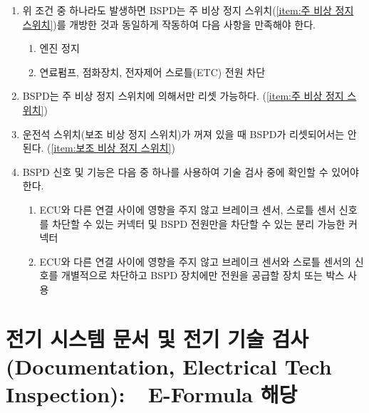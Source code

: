 \documentclass[final,a4paper,10pt]{report}
\begin{document}
\begin{enumerate}
\begin{enumerate}
      \item 위 조건 중 하나라도 발생하면 BSPD는 주 비상 정지 스위치(\cref{item:주 비상 정지 스위치})를 개방한 것과 동일하게 작동하여 다음 사항을 만족해야 한다.
        \begin{enumerate}
          \item 엔진 정지
          \item 연료펌프, 점화장치, 전자제어 스로틀(ETC) 전원 차단
        \end{enumerate}
        
      \item BSPD는 주 비상 정지 스위치에 의해서만 리셋 가능하다. (\cref{item:주 비상 정지 스위치})
      \item 운전석 스위치(보조 비상 정지 스위치)가 꺼져 있을 때 BSPD가 리셋되어서는 안 된다. (\cref{item:보조 비상 정지 스위치})
      
      \item BSPD 신호 및 기능은 다음 중 하나를 사용하여 기술 검사 중에 확인할 수 있어야 한다.
        \begin{enumerate}
          \item ECU와 다른 연결 사이에 영향을 주지 않고 브레이크 센서, 스로틀 센서 신호를 차단할 수 있는 커넥터 및 BSPD 전원만을 차단할 수 있는 분리 가능한 커넥터
          \item ECU와 다른 연결 사이에 영향을 주지 않고 브레이크 센서와 스로틀 센서의 신호를 개별적으로 차단하고 BSPD 장치에만 전원을 공급할 장치 또는 박스 사용
        \end{enumerate}
    \end{enumerate}
\end{enumerate}

\chapter{전기 시스템 문서 및 전기 기술 검사 (Documentation, Electrical Tech Inspection):\ \ E-Formula 해당}
\end{document}
